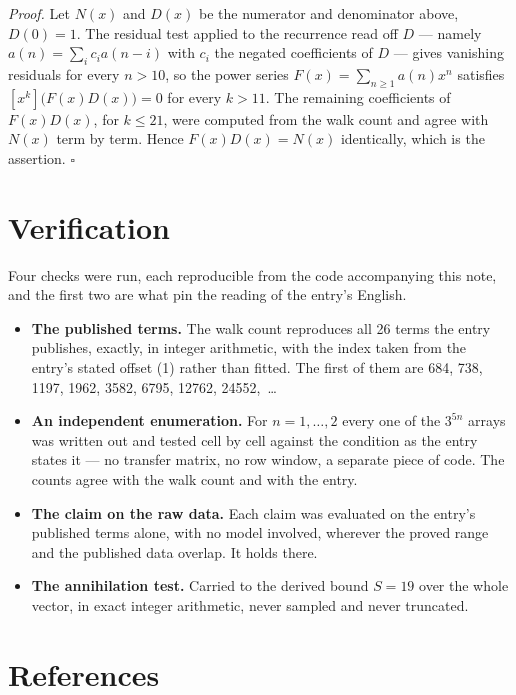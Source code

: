 \documentclass[11pt]{article}
\theoremstyle{definition}
\begin{document}
{\itshape Proof.} Let $N(x)$ and $D(x)$ be the numerator and denominator above, $D(0)=1$. The residual test applied to the recurrence read off $D$ --- namely $a(n) = \sum_i c_i a(n-i)$ with $c_i$ the negated coefficients of $D$ --- gives vanishing residuals for every $n > 10$, so the power series $F(x)=\sum_{n\ge 1}a(n)x^n$ satisfies $[x^k]\bigl(F(x)D(x)\bigr) = 0$ for every $k > 11$. The remaining coefficients of $F(x)D(x)$, for $k \le 21$, were computed from the walk count and agree with $N(x)$ term by term. Hence $F(x)D(x) = N(x)$ identically, which is the assertion. $\square$

\section{Verification}

Four checks were run, each reproducible from the code accompanying this note, and the first two are what pin the reading of the entry's English.

\begin{itemize}

\item {\bfseries The published terms.} The walk count reproduces all 26 terms the entry publishes, exactly, in integer arithmetic, with the index taken from the entry's stated offset (1) rather than fitted. The first of them are 684, 738, 1197, 1962, 3582, 6795, 12762, 24552,~\dots

\item {\bfseries An independent enumeration.} For $n = 1,\dots,2$ every one of the $3^{5n}$ arrays was written out and tested cell by cell against the condition as the entry states it --- no transfer matrix, no row window, a separate piece of code. The counts agree with the walk count and with the entry.

\item {\bfseries The claim on the raw data.} Each claim was evaluated on the entry's published terms alone, with no model involved, wherever the proved range and the published data overlap. It holds there.

\item {\bfseries The annihilation test.} Carried to the derived bound $S = 19$ over the whole vector, in exact integer arithmetic, never sampled and never truncated.

\end{itemize}

\section{References}
\end{document}
